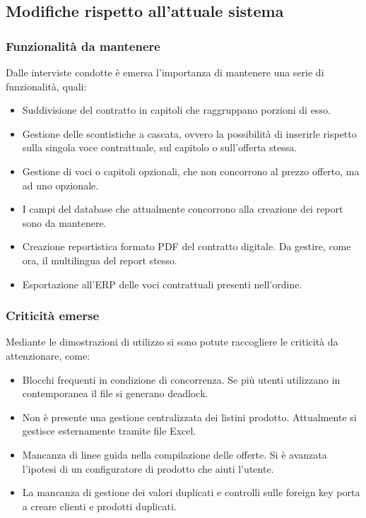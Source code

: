 \subsection{Modifiche rispetto all'attuale sistema}
\subsubsection{Funzionalità da mantenere}
Dalle interviste condotte è emersa l'importanza di mantenere una serie di funzionalità,
quali:
\begin{itemize}
    \item Suddivisione del contratto in capitoli che raggruppano porzioni di esso.
    \item Gestione delle scontistiche a cascata, ovvero la possibilità di inserirle rispetto
          sulla singola voce contrattuale, sul capitolo o sull'offerta stessa.
    \item Gestione di voci o capitoli opzionali, che non concorrono al prezzo offerto, ma ad uno opzionale.
    \item I campi del database che attualmente concorrono alla creazione dei report sono da mantenere.
    \item Creazione reportistica formato PDF del contratto digitale. Da gestire, come ora, il multilingua del report stesso.
    \item Esportazione all'\ac{ERP} delle voci contrattuali presenti nell'ordine.
\end{itemize}
\subsubsection{Criticità emerse}
Mediante le dimostrazioni di utilizzo si sono potute raccogliere le
criticità da attenzionare, come:
\begin{itemize}
    \item Blocchi frequenti in condizione di concorrenza.
          Se più utenti utilizzano in contemporanea il file si generano deadlock.
    \item Non è presente una gestione centralizzata dei listini prodotto.
          Attualmente si gestisce esternamente tramite file Excel.
    \item Mancanza di linee guida nella compilazione delle offerte.
          Si è avanzata l'ipotesi di un configuratore di prodotto che aiuti l'utente.
    \item La mancanza di gestione dei valori duplicati e controlli sulle foreign key porta a creare clienti e prodotti duplicati.
\end{itemize}
